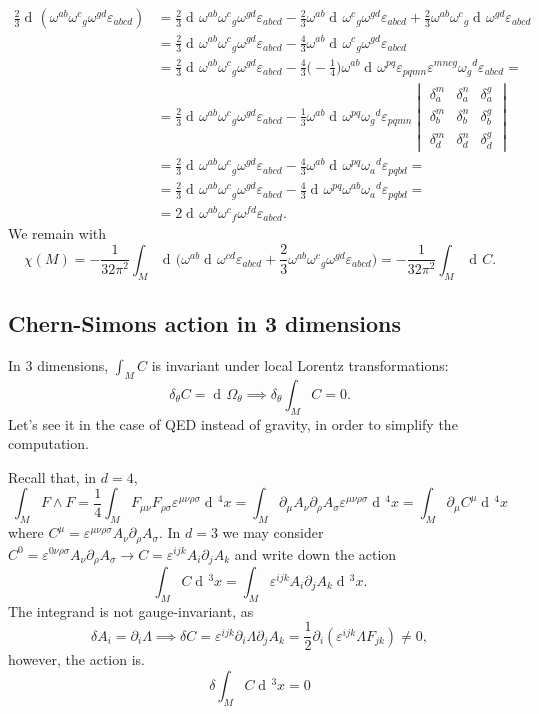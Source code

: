 \documentclass[a4paper,12pt]{book}
\newcommand{\dd}{\mathop{\mathrm{d}\!}{}}
\renewcommand{\epsilon}{\varepsilon}
\theoremstyle{definition}
\theoremstyle{remark}
\begin{document}
\begin{align*}
\frac23\dd(\omega^{ab}\omega^c{}_g\omega^{gd}\epsilon_{abcd})&=\frac23\dd\omega^{ab}\omega^c{}_g\omega^{gd}\epsilon_{abcd}-\frac23\omega^{ab}\dd\omega^c{}_g\omega^{gd}\epsilon_{abcd}+\frac23\omega^{ab}\omega^c{}_g\dd\omega^{gd}\epsilon_{abcd}\\
&=\frac23\dd\omega^{ab}\omega^c{}_g\omega^{gd}\epsilon_{abcd}-\frac43\omega^{ab}\dd\omega^c{}_g\omega^{gd}\epsilon_{abcd}\\
&=\frac23\dd\omega^{ab}\omega^c{}_g\omega^{gd}\epsilon_{abcd}-\frac43\biggl(-\frac14\biggr)\omega^{ab}\dd\omega^{pq}\epsilon_{pqmn}\epsilon^{mncg}\omega_g{}^d\epsilon_{abcd}=\\
&=\frac23\dd\omega^{ab}\omega^c{}_g\omega^{gd}\epsilon_{abcd}-\frac13\omega^{ab}\dd\omega^{pq}\omega_g{}^d\epsilon_{pqmn}
\begin{vmatrix}
\delta^m_a & \delta^n_a & \delta^g_a\\
\delta^m_b & \delta^n_b & \delta^g_b\\
\delta^m_d & \delta^n_d & \delta^g_d
\end{vmatrix}\\
&=\frac23\dd\omega^{ab}\omega^c{}_g\omega^{gd}\epsilon_{abcd}-\frac43\omega^{ab}\dd\omega^{pq}\omega_a{}^d\epsilon_{pqbd}=\\
&=\frac23\dd\omega^{ab}\omega^c{}_g\omega^{gd}\epsilon_{abcd}-\frac43\dd\omega^{pq}\omega^{ab}\omega_a{}^d\epsilon_{pqbd}=\\
&=2\dd\omega^{ab}\omega^c{}_f\omega^{fd}\epsilon_{abcd}.
\end{align*}
We remain with
\[\chi(M)=-\frac1{32\pi^2}\int_M\dd\biggl(\omega^{ab}\dd\omega^{cd}\epsilon_{abcd}+\frac23\omega^{ab}\omega^c{}_g\omega^{gd}\epsilon_{abcd}\biggr)=-\frac1{32\pi^2}\int_M\dd C.\]

\subsection{Chern-Simons action in 3 dimensions}
In 3 dimensions, $\int_MC$ is invariant under local Lorentz transformations:
\[\delta_\theta C=\dd\Omega_\theta\implies\delta_\theta\int_MC=0.\]
Let's see it in the case of QED instead of gravity, in order to simplify the computation.

Recall that, in $d=4$,
\[\int_MF\wedge F=\frac14\int_MF_{\mu\nu}F_{\rho\sigma}\epsilon^{\mu\nu\rho\sigma}\dd^4x=\int_M\partial_\mu A_\nu\partial_\rho A_\sigma\epsilon^{\mu\nu\rho\sigma}\dd^4x=\int_M\partial_\mu C^\mu\dd^4x\]
where $C^\mu=\epsilon^{\mu\nu\rho\sigma}A_\nu\partial_\rho A_\sigma$. In $d=3$ we may consider $C^0=\epsilon^{0\nu\rho\sigma}A_\nu\partial_\rho A_\sigma\longrightarrow C=\epsilon^{ijk}A_i\partial_jA_k$ and write down the action
\[\int_MC\dd^3x=\int_M\epsilon^{ijk}A_i\partial_jA_k\dd^3x.\]
The integrand is not gauge-invariant, as
\[\delta A_i=\partial_i\Lambda\implies\delta C=\epsilon^{ijk}\partial_i\Lambda\partial_jA_k=\frac12\partial_i(\epsilon^{ijk}\Lambda F_{jk})\ne0,\]
however, the action is.
\[\delta\int_MC\dd^3x=0\]
\end{document}
